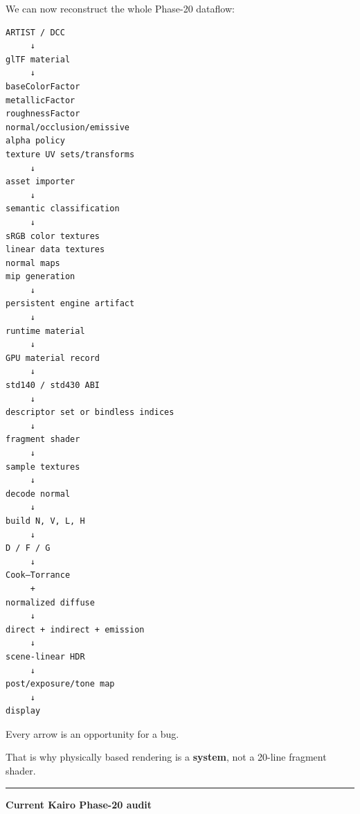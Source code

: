 We can now reconstruct the whole Phase-20 dataflow:

\begin{verbatim}
ARTIST / DCC
     ↓
glTF material
     ↓
baseColorFactor
metallicFactor
roughnessFactor
normal/occlusion/emissive
alpha policy
texture UV sets/transforms
     ↓
asset importer
     ↓
semantic classification
     ↓
sRGB color textures
linear data textures
normal maps
mip generation
     ↓
persistent engine artifact
     ↓
runtime material
     ↓
GPU material record
     ↓
std140 / std430 ABI
     ↓
descriptor set or bindless indices
     ↓
fragment shader
     ↓
sample textures
     ↓
decode normal
     ↓
build N, V, L, H
     ↓
D / F / G
     ↓
Cook–Torrance
     +
normalized diffuse
     ↓
direct + indirect + emission
     ↓
scene-linear HDR
     ↓
post/exposure/tone map
     ↓
display
\end{verbatim}

Every arrow is an opportunity for a bug.

That is why physically based rendering is a \textbf{system}, not a 20-line fragment shader.

\begin{center}\rule{0.5\linewidth}{0.5pt}\end{center}

\textbf{Current Kairo Phase-20 audit}

